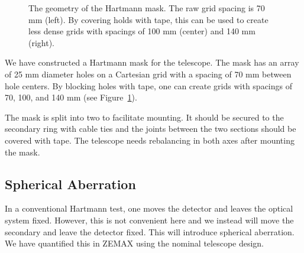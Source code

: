 \begin{figure}
\begin{center}
{
}
\end{center}
\caption{The geometry of the Hartmann mask. The raw grid spacing is 70 mm (left). By covering holds with tape, this can be used to create less dense grids with spacings of 100 mm (center) and 140 mm (right).}
\label{figure:telescope-hartmann-mask-geometry}
\end{figure}

We have constructed a Hartmann mask for the telescope. The mask has an array of 25 mm diameter holes on a Cartesian grid with a spacing of 70 mm between hole centers. By blocking holes with tape, one can create grids with spacings of 70, 100, and 140 mm (see Figure~\ref{figure:telescope-hartmann-mask-geometry}).

The mask is split into two to facilitate mounting. It should be secured to the secondary ring with cable ties and the joints between the two sections should be covered with tape. The telescope needs rebalancing in both axes after mounting the mask.

\subsection{Spherical Aberration}

In a conventional Hartmann test, one moves the detector and leaves the optical system fixed. However, this is not convenient here and we instead will move the secondary and leave the detector fixed. This will introduce spherical aberration. We have quantified this in ZEMAX using the nominal telescope design.

